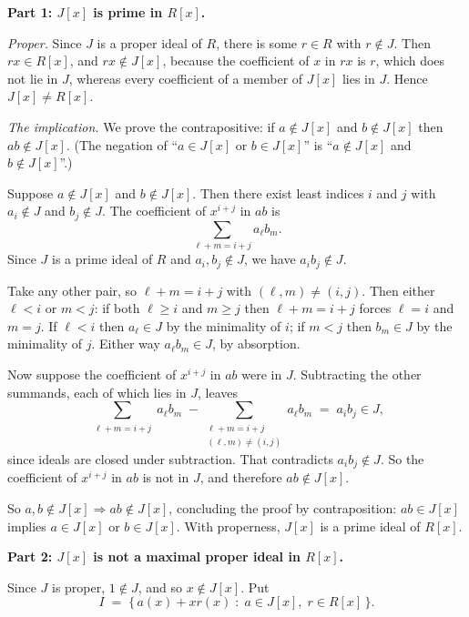 \documentclass[11pt]{article}
\begin{document}
\begin{solution}
  \textbf{Part 1: $J[x]$ is prime in $R[x]$.}

  \emph{Proper.} Since $J$ is a proper ideal of $R$, there is some $r \in R$
  with $r \notin J$. Then $rx \in R[x]$, and $rx \notin J[x]$, because the
  coefficient of $x$ in $rx$ is $r$, which does not lie in $J$, whereas every
  coefficient of a member of $J[x]$ lies in $J$. Hence $J[x] \neq R[x]$.

  \emph{The implication.} We prove the contrapositive: if $a \notin J[x]$ and
  $b \notin J[x]$ then $ab \notin J[x]$. (The negation of ``$a \in J[x]$ or
  $b \in J[x]$'' is ``$a \notin J[x]$ and $b \notin J[x]$''.)

  Suppose $a \notin J[x]$ and $b \notin J[x]$. Then there exist least indices
  $i$ and $j$ with $a_{i} \notin J$ and $b_{j} \notin J$. The coefficient of
  $x^{i+j}$ in $ab$ is
  \[
    \sum_{\ell + m = i + j} a_{\ell} b_{m}.
  \]
  Since $J$ is a prime ideal of $R$ and $a_{i}, b_{j} \notin J$, we have
  $a_{i} b_{j} \notin J$.

  Take any other pair, so $\ell + m = i + j$ with $(\ell, m) \neq (i, j)$. Then
  either $\ell < i$ or $m < j$: if both $\ell \geq i$ and $m \geq j$ then
  $\ell + m = i + j$ forces $\ell = i$ and $m = j$. If $\ell < i$ then
  $a_{\ell} \in J$ by the minimality of $i$; if $m < j$ then $b_{m} \in J$ by
  the minimality of $j$. Either way $a_{\ell} b_{m} \in J$, by absorption.

  Now suppose the coefficient of $x^{i+j}$ in $ab$ were in $J$. Subtracting the
  other summands, each of which lies in $J$, leaves
  \[
    \sum_{\substack{\ell + m = i + j}} a_{\ell} b_{m}
      \;-\!\!\sum_{\substack{\ell + m = i + j \\ (\ell, m) \neq (i, j)}}\!\! a_{\ell} b_{m}
      \;=\; a_{i} b_{j} \in J,
  \]
  since ideals are closed under subtraction. That contradicts
  $a_{i} b_{j} \notin J$. So the coefficient of $x^{i+j}$ in $ab$ is not in
  $J$, and therefore $ab \notin J[x]$.

  So $a, b \notin J[x] \Rightarrow ab \notin J[x]$, concluding the proof by
  contraposition: $ab \in J[x]$ implies $a \in J[x]$ or $b \in J[x]$. With
  properness, $J[x]$ is a prime ideal of $R[x]$.

  \medskip
  \textbf{Part 2: $J[x]$ is not a maximal proper ideal in $R[x]$.}

  Since $J$ is proper, $1 \notin J$, and so $x \notin J[x]$. Put
  \[
    I \;=\; \{\, a(x) + x r(x) \;:\; a \in J[x],\; r \in R[x] \,\}.
  \]


\end{solution}
\end{document}
